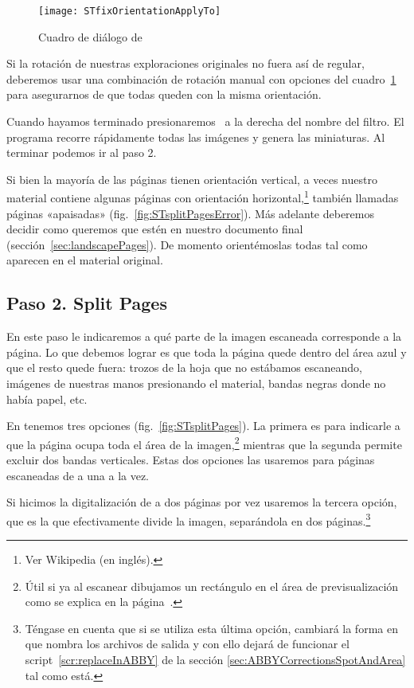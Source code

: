 \documentclass[%
	a5paper,
	10pt,
	twoside,
	openright,
	final,
]{memoir}
\begin{document}
	\begin{figure}
		\centering
		\texttt{[image: STfixOrientationApplyTo]}
		\caption[Cuadro de diálogo \emph{Apply to\...} de \scantailor]{Cuadro de diálogo  de \scantailor\label{fig:STfixOrientationApplyTo}}
	\end{figure}

	Si la rotación de nuestras exploraciones originales no fuera así de regular, deberemos usar una combinación de rotación manual con opciones del cuadro~\ref{fig:STfixOrientationApplyTo} para asegurarnos de que todas queden con la misma orientación.

	Cuando hayamos terminado presionaremos \play\ a la derecha del nombre del filtro. El programa recorre rápidamente todas las imágenes y genera las miniaturas. Al terminar podemos ir al paso 2.

	 Si bien la mayoría de las páginas tienen orientación vertical, a veces nuestro material contiene algunas páginas con orientación horizontal,\footnote{Ver Wikipedia \cite{WikipediaPageOrientation} (en inglés).} también llamadas páginas «apaisadas» (fig.~\ref{fig:STsplitPagesError}). Más adelante deberemos decidir como queremos que estén en nuestro documento final (sección~\ref{sec:landscapePages}). De momento orientémoslas todas tal como aparecen en el material original.

	\subsection{Paso 2. Split Pages\label{sec:STsplitPages}} En este paso le indicaremos a \scantailor qué parte de la imagen escaneada corresponde a la página. Lo que debemos lograr es que toda la página quede dentro del área azul y que el resto quede fuera: trozos de la hoja que no estábamos escaneando, imágenes de nuestras manos presionando el material, bandas negras donde no había papel, etc.

	En  tenemos tres opciones (fig.~\ref{fig:STsplitPages}). La primera es para indicarle a \scantailor que la página ocupa toda el área de la imagen,\footnote{Útil si ya al escanear dibujamos un rectángulo en el área de previsualización como se explica en la página~\pageref{pag:scanningRegionSelection}.} mientras que la segunda permite excluir dos bandas verticales. Estas dos opciones las usaremos para páginas escaneadas de a una a la vez.

	Si hicimos la digitalización de a dos páginas por vez usaremos la tercera opción, que es la que efectivamente divide la imagen, separándola en dos páginas.\footnote{Téngase en cuenta que si se utiliza esta última opción, cambiará la forma en que \scantailor nombra los archivos de salida y con ello dejará de funcionar el script~\ref{scr:replaceInABBY} de la sección \ref{sec:ABBYCorrectionsSpotAndArea} tal como está.}
\end{document}
